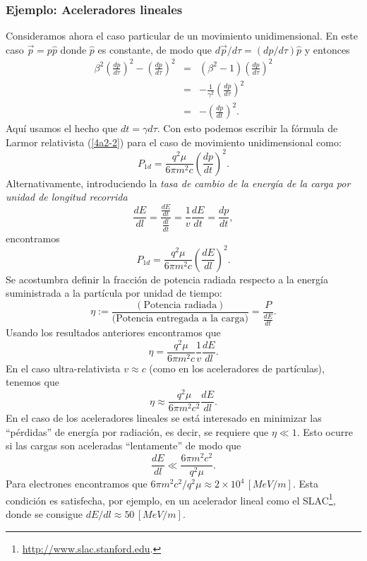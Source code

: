 \subsubsection{Ejemplo: Aceleradores lineales}
Consideramos ahora el caso particular de un movimiento unidimensional. En este
caso $\vec{p}=p\hat{p}$ donde $\hat{p}$ es constante, de modo que
${d\vec{p}}/{d\tau}=({dp}/{d\tau})\hat{p}$ y entonces
\begin{eqnarray}
\beta^2\left(\frac{dp}{d\tau}\right)^2-\left( \frac{dp}{d\tau}\right)^2
&=&\left( \beta^2-1\right) \left(  \frac{dp}{d\tau}\right)^2\\
&=&-\frac{1}{\gamma^2} \left(  \frac{dp}{d\tau}\right)^2\\
&=&-\left(\frac{dp}{dt}\right)^2.
\end{eqnarray}
Aquí usamos el hecho que $dt=\gamma d\tau$. Con esto podemos escribir la fórmula de Larmor relativista (\ref{4a2-2}) para el caso de movimiento unidimensional como:
\begin{equation}
\boxed{P_{1d}=\frac{q^2\mu}{6\pi m^2c}\left(  \frac{dp}{dt}\right)^2.}
\end{equation}
Alternativamente, introduciendo la \textit{tasa de cambio de la energía de la
carga por unidad de longitud recorrida}
\begin{equation}
 \frac{dE}{dl}=\frac{\frac{dE}{dt}}{\frac{dl}{dt}}=\frac{1}{v}\frac{dE}{dt}
= \frac{dp}{dt},
\end{equation}
encontramos
\begin{equation}
\boxed{P_{1d}=\frac{q^2\mu}{6\pi m^2c}\left(  \frac{dE}{dl}\right)^2.}
\end{equation}
Se acostumbra definir la fracción de potencia radiada respecto a la energía
suministrada a la partícula por unidad de tiempo:
\begin{equation}
\eta:=\frac{\left( \text{Potencia radiada}\right) }{\text{(Potencia entregada a la carga)}}=\frac{P}{\frac{dE}{dt}}.
\end{equation}
Usando los resultados anteriores encontramos que
\begin{equation}
\eta=\frac{q^2\mu}{6\pi m^2c}\frac{1}{v}\frac{dE}{dl}.
\end{equation}
En el caso ultra-relativista $v\approx c$ (como en los aceleradores de
partículas), tenemos que
\begin{equation}
\eta\approx\frac{q^2\mu}{6\pi m^2c^2}\frac{dE}{dl}.
\end{equation}
En el caso de los aceleradores lineales se está interesado en minimizar las
``pérdidas'' de energía por radiación, es decir, se requiere que $\eta\ll 1$.
Esto ocurre si las cargas son aceleradas ``lentamente'' de modo que
\begin{equation}
\frac{dE}{dl}\ll \frac{6\pi m^2c^2}{q^2\mu}.
\end{equation}
Para electrones encontramos que ${6\pi m^2c^2}/{q^2\mu}\approx 2\times 10^4\, 
[MeV/m]$. Esta condición es satisfecha, por ejemplo, en un acelerador lineal como
el SLAC\footnote{\url{http://www.slac.stanford.edu}.}, donde se consigue
${dE}/{dl}\approx 50\, [MeV/m]$.

